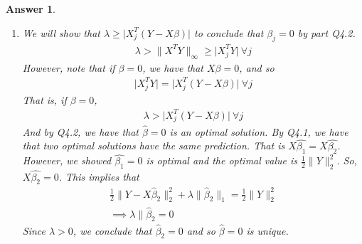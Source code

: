 \documentclass[12pt]{article}
\theoremstyle{colon}
\newtheorem*{answer}{Answer}
\begin{document}
\begin{answer}
\begin{enumerate}[label=\arabic*)]
    \item We will show that $\lambda \geq \lvert X_j^T(Y - X \beta) \rvert$ to conclude that $\beta_j = 0$ by part Q4.2.
      \begin{gather*}
        \lambda > \lVert X^T Y \rVert_\infty \geq \lvert X_j^T Y \rvert \ \forall j
      \end{gather*}
      However, note that if $\beta = 0$, we have that $X \beta = 0$, and so
      \begin{gather*}
        \lvert X_j^T Y \rvert = \lvert X_j^T (Y - X \beta) \rvert \ \forall j
      \end{gather*}
      That is, if $\beta = 0$,
      \begin{gather*}
        \lambda > \lvert X_j^T (Y - X \beta) \rvert \ \forall j
      \end{gather*}
      And by Q4.2, we have that $\widehat{\beta} = 0$ is an optimal solution. By Q4.1, we have that two optimal solutions have the same prediction. That is $X \widehat{\beta_1} = X \widehat{\beta_2}$. However, we showed $\widehat{\beta_1} = 0$ is optimal and the optimal value is $\frac{1}{2}\lVert Y \rVert_2^2$. So, $X \widehat{\beta_2} = 0$. This implies that
      \begin{gather*}
        \frac{1}{2} \lVert Y - X \widehat{\beta}_2 \rVert_2^2 + \lambda \lVert \widehat{\beta}_2 \rVert_1 = \frac{1}{2}\lVert Y \rVert_2^2 \\
        \implies \lambda \lVert \widehat{\beta}_2 = 0
      \end{gather*}
      Since $\lambda > 0$, we conclude that $\widehat{\beta}_2 = 0$ and so $\widehat{\beta} = 0$ is unique.


\end{enumerate}
\end{answer}
\end{document}
